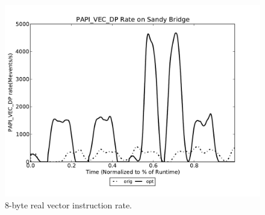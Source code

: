 \begin{figure}
\begin{minipage}{1.\textwidth}
\begin{center}
   \label{fig:perfTestWACCM-L3}
   \end{center}
\end{minipage}
\begin{minipage}{1.\textwidth}
   \begin{center}
   \includegraphics[width=1.\linewidth,height=.29\textheight]{figures/perfTestWACCM-PAPI_VEC_DP.pdf}
   \caption{8-byte real vector instruction rate.}
   \label{fig:perfTestWACCM-VEC}
   \end{center}
\end{minipage}
\end{figure}



